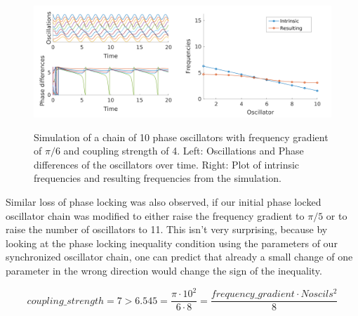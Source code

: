 \documentclass[a4paper]{scrartcl}
\begin{document}
\begin{figure}[!h]
	\centering
	\includegraphics[width=0.5\textwidth]{fig/chain_phase_oscil-6a_unstable.png}\includegraphics[width=0.5\textwidth]{fig/chain_phase_oscil_freq-6a_unstable.png}
	\caption{Simulation of a chain of 10 phase oscillators with frequency gradient of $\pi /6$ and coupling strength of 4. Left: Oscillations and Phase differences of the oscillators over time. Right: Plot of intrinsic frequencies and resulting frequencies from the simulation.}
\end{figure}

Similar loss of phase locking was also observed, if our initial phase locked oscillator chain was modified to either raise the frequency gradient to $\pi /5$ or to raise the number of oscillators to 11. This isn't very surprising, because by looking at the phase locking inequality condition using the parameters of our synchronized oscillator chain, one can predict that already a small change of one parameter in the wrong direction would change the sign of the inequality.

\begin{equation}
	coupling \_ strength = 7 > 6.545 =\frac{\pi \cdot 10^{2}}{6 \cdot 8} = \frac{frequency \_ gradient \cdot Noscils^2}{8}
\end{equation}


\newpage
\end{document}
